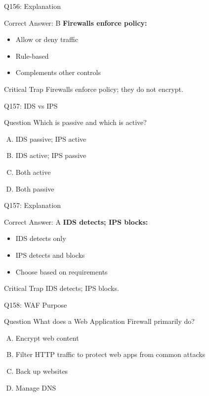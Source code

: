 \documentclass{beamer}
\begin{document}
	\begin{frame}{Q156: Explanation}
		\begin{block}{Correct Answer: B}
			\textbf{Firewalls enforce policy:}
			\begin{itemize}
				\item Allow or deny traffic
				\item Rule-based
				\item Complements other controls
			\end{itemize}
		\end{block}
		\begin{alertblock}{Critical Trap}
			Firewalls enforce policy; they do not encrypt.
		\end{alertblock}
	\end{frame}
	
	\begin{frame}{Q157: IDS vs IPS}
		\begin{block}{Question}
			Which is passive and which is active?
		\end{block}
		\begin{enumerate}[(A)]
			\item IDS passive; IPS active
			\item IDS active; IPS passive
			\item Both active
			\item Both passive
		\end{enumerate}
	\end{frame}
	
	\begin{frame}{Q157: Explanation}
		\begin{block}{Correct Answer: A}
			\textbf{IDS detects; IPS blocks:}
			\begin{itemize}
				\item IDS detects only
				\item IPS detects and blocks
				\item Choose based on requirements
			\end{itemize}
		\end{block}
		\begin{alertblock}{Critical Trap}
			IDS detects; IPS blocks.
		\end{alertblock}
	\end{frame}
	
	\begin{frame}{Q158: WAF Purpose}
		\begin{block}{Question}
			What does a Web Application Firewall primarily do?
		\end{block}
		\begin{enumerate}[(A)]
			\item Encrypt web content
			\item Filter HTTP traffic to protect web apps from common attacks
			\item Back up websites
			\item Manage DNS
		\end{enumerate}
	\end{frame}
	
\end{document}
